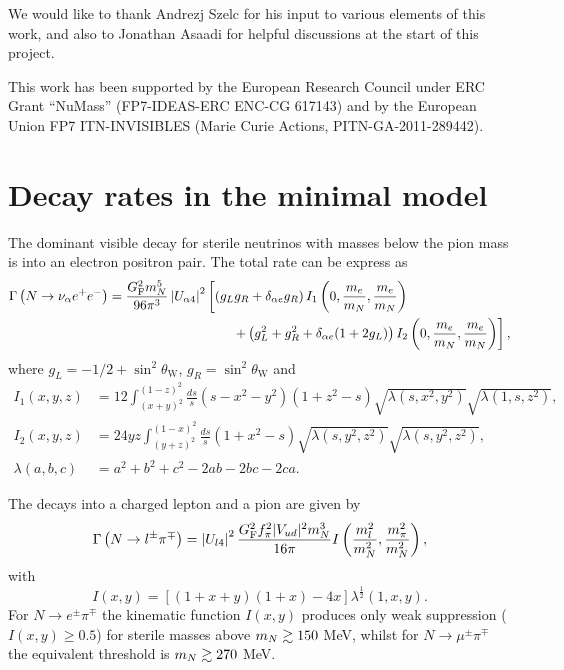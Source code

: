 \documentclass[11pt, a4paper]{article}
\def\ster{\ensuremath N}
\begin{document}
We would like to thank Andrezj Szelc for his input to various elements of this
work, and also to Jonathan Asaadi for helpful discussions at the start of this
project.

This work has been supported by the European Research Council under ERC Grant
“NuMass” (FP7-IDEAS-ERC ENC-CG 617143) and by the European Union FP7
ITN-INVISIBLES (Marie Curie Actions, PITN-GA-2011-289442).

\appendix

\section{\label{app:decayrates}Decay rates in the minimal model}

The dominant visible decay for sterile neutrinos with masses below the pion
mass is into an electron positron pair. The total rate can be express as
%
\begin{align*} \Gamma\left(\ster\to \nu_\alpha e^+e^-\right) =
\frac{G_\text{F}^2m_\ster^5}{96\pi^3}\left|U_{\alpha 4}\right|^2&\left[\left( g_Lg_R + \delta_{\alpha e}g_R\right)I_1\left(0,\frac{m_e}{m_\ster}, \frac{
m_e}{m_\ster}\right)\right.\\ 
&\left.\qquad + \left(g_L^2 + g_R^2 + \delta_{\alpha e}(1+2g_L)\right)I_2\left(0,\frac{m_e}{m_\ster},\frac{m_e}{m_\ster}\right)\right],  \end{align*}
%
where $g_L = -1/2 + \sin^2\theta_\text{W}$, $g_R = \sin^2\theta_\text{W}$ and
% 
\begin{align*} I_1(x,y,z) & =12 \int_{(x+y)^2}^{(1-z)^2}
\frac{ds}{s}(s-x^2-y^2)(1+z^2-s)\sqrt{\lambda(s,x^2,y^2)}\sqrt{\lambda(1,s,z^2)},\\
I_2(x,y,z)& =24yz\int_{(y+z)^2}^{(1-x)^2}\frac{ds}{s}\left(1+x^2-s\right)\sqrt{\lambda\left(s,y^2,z^2\right)}\sqrt{\lambda\left(s,y^2,z^2\right)},\\
\lambda(a,b,c) &= a^2+b^2+c^2 - 2ab-2bc-2ca.  \end{align*}
%

The decays into a charged lepton and a pion are given by 
%
\[ \Gamma\left(\ster\to l^\pm\pi^\mp\right) =
\left|U_{l4}\right|^2\frac{G_\text{F}^2f_\pi^2 |V_{ud}|^2
m_\ster^3}{16\pi}I\left(\frac{m_l^2}{m_\ster^2} ,
\frac{m_\pi^2}{m_\ster^2}\right) , \] 
%
with \[ I(x,y) = \left[ \left( 1+x+y\right) \left(1+x\right) -4 x\right]
\lambda^\frac{1}{2}\left(1,x,y\right).  \]
%
For $N\to e^\pm\pi^\mp$ the kinematic function $I(x,y)$ produces only weak suppression ($I(x,y)\geq 0.5$) for sterile masses above $m_\ster\gtrsim 150$ MeV, whilst for $N\to
\mu^\pm\pi^\mp$ the equivalent threshold is $m_\ster\gtrsim 270$ MeV.
\end{document}

